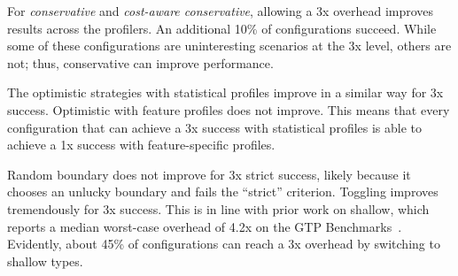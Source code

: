 For \emph{conservative} and \emph{cost-aware conservative}, allowing a 3x overhead
improves results across the profilers.
An additional 10\% of configurations succeed.
While some of these configurations are uninteresting scenarios at the 3x level,
others are not; thus, conservative can improve performance.

The optimistic strategies with statistical profiles improve in a similar way
for 3x success.
Optimistic with feature profiles does not improve.
This means that every configuration that can achieve a 3x success with statistical
profiles is able to achieve a 1x success with feature-specific profiles.

Random boundary does not improve for 3x strict success, likely because it chooses
an unlucky boundary and fails the ``strict'' criterion.
Toggling improves tremendously for 3x success.
This is in line with prior work on shallow, which reports a median worst-case overhead
of 4.2x on the GTP Benchmarks~\cite{g-deep-shallow}.
Evidently, about 45\% of configurations can reach a 3x overhead by switching to
shallow types.


